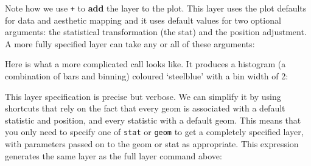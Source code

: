 \begin{Shaded}
\begin{Highlighting}[]
\StringTok{ }\StringTok{ }\NormalTok{(} \NormalTok{)}
\end{Highlighting}
\end{Shaded}

Note how we use \texttt{+} to \textbf{add} the layer to the plot.
 \indexc{+} This layer uses the plot defaults for
data and aesthetic mapping and it uses default values for two optional
arguments: the statistical transformation (the stat) and the position
adjustment. A more fully specified layer can take any or all of these
arguments:

\begin{Shaded}
\begin{Highlighting}[]
\end{Highlighting}
\end{Shaded}

Here is what a more complicated call looks like. It produces a histogram
(a combination of bars and binning) coloured `steelblue' with a bin
width of 2:

\begin{Shaded}
\begin{Highlighting}[]
\StringTok{ }\NormalTok{(} 
\StringTok{ }\StringTok{ }\NormalTok{(}
   \NormalTok{, }
   \NormalTok{(} \NormalTok{),}
   \NormalTok{,}
   \NormalTok{(} \NormalTok{)}
\NormalTok{)}
\end{Highlighting}
\end{Shaded}

This layer specification is precise but verbose. We can simplify it by
using shortcuts that rely on the fact that every geom is associated with
a default statistic and position, and every statistic with a default
geom. This means that you only need to specify one of \texttt{stat} or
\texttt{geom} to get a completely specified layer, with parameters
passed on to the geom or stat as appropriate. This expression generates
the same layer as the full layer command above:

